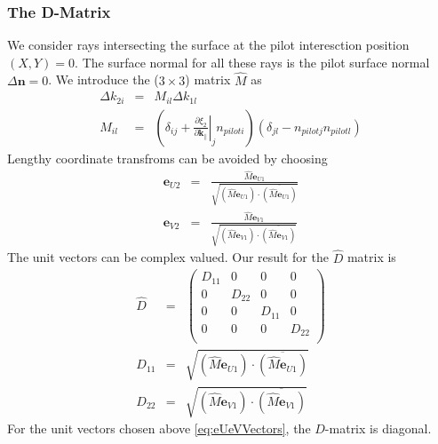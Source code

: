 \documentclass[12pt,a4paper,twoside,openright,BCOR10mm,headsepline,titlepage,abstracton,chapterprefix,final]{scrreprt}
\newcommand\Vector[1]{{\mathbf{#1}}}
\newcommand\wavenumber{k}
\newcommand\Wavevector{\Vector{\wavenumber}}
\begin{document}
\subsubsection{The D-Matrix}
We consider rays intersecting the surface at the pilot interesction position $(X,Y) = 0$.
The surface normal for all these rays is the pilot surface normal $\Delta \Vector{n} = 0$.
We introduce the ($3\times3$) matrix $\hat{M}$ as
\begin{eqnarray}
 \Delta \wavenumber_{2i} &=& M_{il} \Delta \wavenumber_{1l} \\
 M_{il}
 &=& 
 \left( 
       \delta_{ij}
       + \left. \frac{\partial \xi_2}{\partial \Wavevector_{\parallel}} \right|_j n_{pilot i}
 \right) 
 ( \delta_{jl} -  n_{pilot j} n_{pilot l} )
\end{eqnarray}
Lengthy coordinate transfroms can be avoided by choosing
\begin{subequations} \label{eq:eUeVVectors}
  \begin{eqnarray}
    \Vector{e}_{U2} &=& \frac{ \hat{M} \Vector{e}_{U1} }{\sqrt{ (\hat{M} \Vector{e}_{U1})\cdot \overline{(\hat{M} \Vector{e}_{U1})} }} \\
    \Vector{e}_{V2} &=& \frac{ \hat{M} \Vector{e}_{V1} }{\sqrt{ (\hat{M} \Vector{e}_{V1})\cdot \overline{(\hat{M} \Vector{e}_{V1})} }}
  \end{eqnarray}
\end{subequations}
The unit vectors can be complex valued.
Our result for the $\hat{D}$ matrix is
\begin{eqnarray}
 \hat{D} &=&
 \begin{pmatrix}
  D_{11} & 0 & 0 & 0 \\
  0 & D_{22} & 0 & 0 \\
  0 & 0 & D_{11} & 0 \\
  0 & 0 & 0 & D_{22} \\
 \end{pmatrix}
 \\
 D_{11} &=& \sqrt{ (\hat{M} \Vector{e}_{U1})\cdot \overline{(\hat{M} \Vector{e}_{U1})} } \\
 D_{22} &=& \sqrt{ (\hat{M} \Vector{e}_{V1})\cdot \overline{(\hat{M} \Vector{e}_{V1})} }
\end{eqnarray}
For the unit vectors chosen above \eqref{eq:eUeVVectors}, the $D$-matrix is diagonal.
\end{document}
